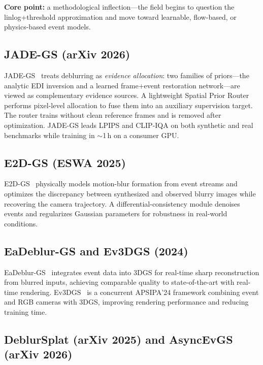 \textbf{Core point:} a methodological inflection---the field begins to question the linlog+threshold approximation and move toward learnable, flow-based, or physics-based event models.

\subsection{JADE-GS (arXiv 2026)}
\label{sec:deblur:jadegs}

JADE-GS~\cite{fu2026jadegs} treats deblurring as \emph{evidence allocation}: two families of priors---the analytic EDI inversion and a learned frame+event restoration network---are viewed as complementary evidence sources. A lightweight Spatial Prior Router performs pixel-level allocation to fuse them into an auxiliary supervision target. The router trains without clean reference frames and is removed after optimization. JADE-GS leads LPIPS and CLIP-IQA on both synthetic and real benchmarks while training in $\sim$1\,h on a consumer GPU.

\subsection{E2D-GS (ESWA 2025)}
\label{sec:deblur:e2dgs}

E2D-GS~\cite{lin2025e2dgs} physically models motion-blur formation from event streams and optimizes the discrepancy between synthesized and observed blurry images while recovering the camera trajectory. A differential-consistency module denoises events and regularizes Gaussian parameters for robustness in real-world conditions.

\subsection{EaDeblur-GS and Ev3DGS (2024)}
\label{sec:deblur:early}

EaDeblur-GS~\cite{weng2024eadeblur} integrates event data into 3DGS for real-time sharp reconstruction from blurred inputs, achieving comparable quality to state-of-the-art with real-time rendering. Ev3DGS~\cite{huang2024ev3dgs} is a concurrent APSIPA'24 framework combining event and RGB cameras with 3DGS, improving rendering performance and reducing training time.

\subsection{DeblurSplat (arXiv 2025) and AsyncEvGS (arXiv 2026)}
\label{sec:deblur:free}

